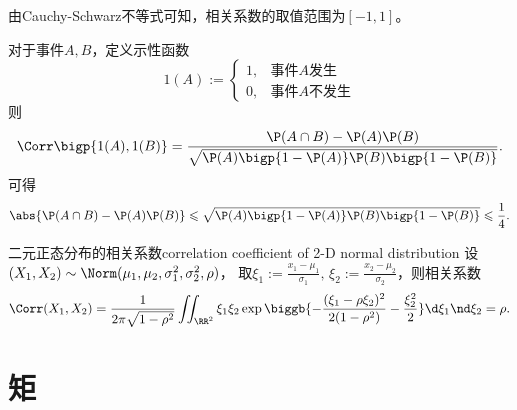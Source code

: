 \begin{corollary}
	由Cauchy-Schwarz不等式可知，相关系数的取值范围为$[-1,1]$。
\end{corollary}

\begin{corollary}
	对于事件$A,B$，定义示性函数
	\begin{equation}
		1(A):=\begin{cases}
			1,&\text{事件$A$发生}\\
			0,&\text{事件$A$不发生}
		\end{cases}
	\end{equation}
	则
	\begin{equation}
		\Corr\bigp{1(A),1(B)}=\frac{\P(A\cap B)-\P(A)\P(B)}{\sqrt{\P(A)\bigp{1-\P(A)}\P(B)\bigp{1-\P(B)}}}.
	\end{equation}
	可得
	\begin{equation}
		\abs{\P(A\cap B)-\P(A)\P(B)}\leqslant\sqrt{\P(A)\bigp{1-\P(A)}\P(B)\bigp{1-\P(B)}}\leqslant\frac14.
	\end{equation}
\end{corollary}

\begin{example}{二元正态分布的相关系数}{correlation coefficient of 2-D normal distribution}
	设$(X_1,X_2)\sim\Norm(\mu_1,\mu_2,\sigma_1^2,\sigma_2^2,\rho)$，
	取$\xi_1:=\frac{x_1-\mu_1}{\sigma_1},\,\xi_2:=\frac{x_2-\mu_2}{\sigma_2}$，则相关系数
	\[
		\Corr(X_1,X_2)=\frac1{2\pi\sqrt{1-\rho^2}}\iint_{\RR^2}\xi_1\xi_2\exp\biggb{-\frac{(\xi_1-\rho\xi_2)^2}{2(1-\rho^2)}-\frac{\xi_2^2}2}\d\xi_1\nd\xi_2=\rho.
	\]
\end{example}

\section{矩}

